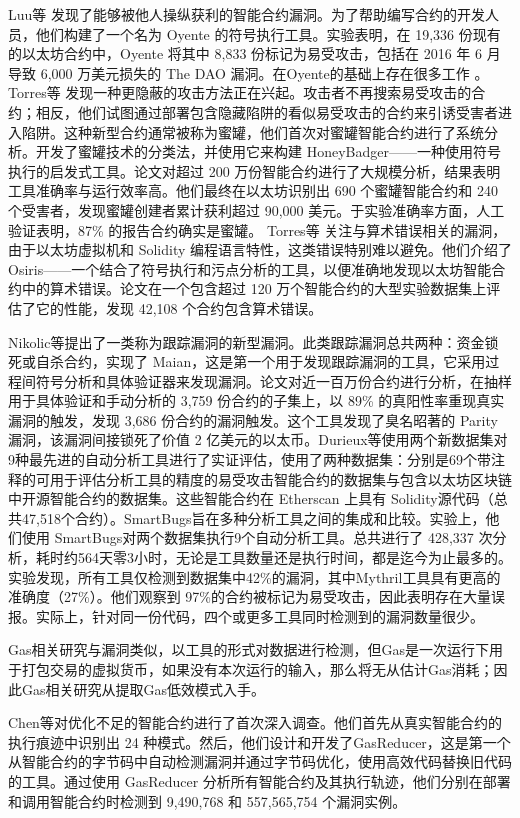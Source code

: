 Luu等 \cite{oyente}发现了能够被他人操纵获利的智能合约漏洞。为了帮助编写合约的开发人员，他们构建了一个名为 Oyente 的符号执行工具。实验表明，在 19,336 份现有的以太坊合约中，Oyente 将其中 8,833 份标记为易受攻击，包括在 2016 年 6 月导致 6,000 万美元损失的 The DAO 漏洞。在Oyente的基础上存在很多工作 \cite{honey}\cite{Osiris}\cite{maian}。Torres等 \cite{honey} 发现一种更隐蔽的攻击方法正在兴起。攻击者不再搜索易受攻击的合约；相反，他们试图通过部署包含隐藏陷阱的看似易受攻击的合约来引诱受害者进入陷阱。这种新型合约通常被称为蜜罐，他们首次对蜜罐智能合约进行了系统分析。开发了蜜罐技术的分类法，并使用它来构建 HoneyBadger——一种使用符号执行的启发式工具。论文对超过 200 万份智能合约进行了大规模分析，结果表明工具准确率与运行效率高。他们最终在以太坊识别出 690 个蜜罐智能合约和 240 个受害者，发现蜜罐创建者累计获利超过 90,000 美元。于实验准确率方面，人工验证表明，87\% 的报告合约确实是蜜罐。
Torres等 \cite{Osiris} 关注与算术错误相关的漏洞，由于以太坊虚拟机和 Solidity 编程语言特性，这类错误特别难以避免。他们介绍了 Osiris——一个结合了符号执行和污点分析的工具，以便准确地发现以太坊智能合约中的算术错误。论文在一个包含超过 120 万个智能合约的大型实验数据集上评估了它的性能，发现 42,108 个合约包含算术错误。

Nikolic等\cite{maian}提出了一类称为跟踪漏洞的新型漏洞。此类跟踪漏洞总共两种：资金锁死或自杀合约，实现了 Maian，这是第一个用于发现跟踪漏洞的工具，它采用过程间符号分析和具体验证器来发现漏洞。论文对近一百万份合约进行分析，在抽样用于具体验证和手动分析的 3,759 份合约的子集上，以 89\% 的真阳性率重现真实漏洞的触发，发现 3,686 份合约的漏洞触发。这个工具发现了臭名昭著的 Parity 漏洞，该漏洞间接锁死了价值 2 亿美元的以太币。Durieux等\cite{tool_paper}使用两个新数据集对9种最先进的自动分析工具进行了实证评估，使用了两种数据集：分别是69个带注释的可用于评估分析工具的精度的易受攻击智能合约的数据集与包含以太坊区块链中开源智能合约的数据集。这些智能合约在 Etherscan 上具有 Solidity源代码（总共47,518个合约）。SmartBugs旨在多种分析工具之间的集成和比较。实验上，他们使用 SmartBugs对两个数据集执行9个自动分析工具。总共进行了 428,337 次分析，耗时约564天零3小时，无论是工具数量还是执行时间，都是迄今为止最多的。实验发现，所有工具仅检测到数据集中42\%的漏洞，其中Mythril工具具有更高的准确度（27\%）。他们观察到 97\%的合约被标记为易受攻击，因此表明存在大量误报。实际上，针对同一份代码，四个或更多工具同时检测到的漏洞数量很少。

Gas相关研究与漏洞类似，以工具的形式对数据进行检测，但Gas是一次运行下用于打包交易的虚拟货币，如果没有本次运行的输入，那么将无从估计Gas消耗；因此Gas相关研究从提取Gas低效模式入手。

Chen等\cite{saveMoney}对优化不足的智能合约进行了首次深入调查。他们首先从真实智能合约的执行痕迹中识别出 24 种模式。然后，他们设计和开发了GasReducer，这是第一个从智能合约的字节码中自动检测漏洞并通过字节码优化，使用高效代码替换旧代码的工具。通过使用 GasReducer 分析所有智能合约及其执行轨迹，他们分别在部署和调用智能合约时检测到 9,490,768 和 557,565,754 个漏洞实例。

